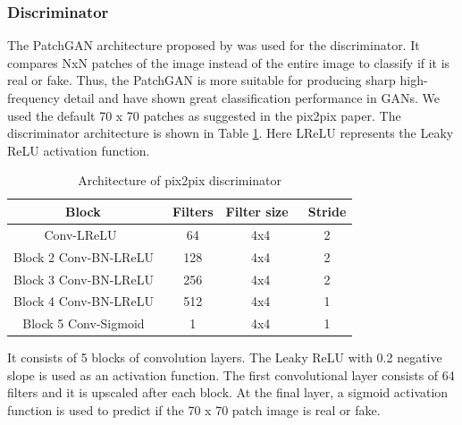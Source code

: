 \subsubsection*{Discriminator}

The PatchGAN architecture proposed by \cite{li2016precomputed} was used for the discriminator. It compares NxN patches of the image instead of the entire image to classify if it is real or fake. Thus, the PatchGAN is more suitable for producing sharp high-frequency detail and have shown great classification performance in GANs. We used the default 70 x 70 patches as suggested in the pix2pix paper. The discriminator architecture is shown in Table \ref{tab:tab2}. Here LReLU represents the Leaky ReLU activation function.

\begin{table}[H]
\centering
\begin{tabular}{|c|c|c|c|} 
\hline
\textbf{Block~}        & \textbf{Filters} & \textbf{Filter size~} & \textbf{Stride}  \\ 
\hline
Conv-LReLU~~           & 64               & 4x4                   & 2                \\ 
\hline
Block 2 Conv-BN-LReLU~ & 128              & 4x4                   & 2                \\ 
\hline
Block 3 Conv-BN-LReLU~ & 256              & 4x4                   & 2                \\ 
\hline
Block 4 Conv-BN-LReLU~ & 512              & 4x4                   & 1                \\ 
\hline
Block 5 Conv-Sigmoid~  & 1                & 4x4                   & 1                \\
\hline
\end{tabular}
\caption{Architecture of pix2pix discriminator}
\label{tab:tab2}
\end{table}

It consists of 5 blocks of convolution layers. The Leaky ReLU with 0.2 negative slope is used as an activation function. The first convolutional layer consists of 64 filters and it is upscaled after each block. At the final layer, a sigmoid activation function is used to predict if the 70 x 70 patch image is real or fake.

